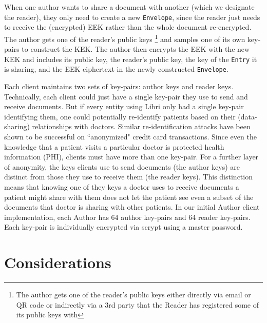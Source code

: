 \documentclass[10pt]{article}
\newcommand{\ttt}[1]{\texttt{#1}}
\def\Entry{\ttt{Entry}}
\def\Envelope{\ttt{Envelope}}
\begin{document}
When one author wants to share a document with another (which we designate the reader), they only need to create a new \Envelope{}, since the reader just needs to receive the (encrypted) EEK rather than the whole document re-encrypted. The author gets one of the reader's public keys \footnote{The author gets one of the reader's public keys either directly via email or QR code or indirectly via a 3rd party that the Reader has registered some of its public keys with} and samples one of its own key-pairs to construct the KEK. The author then encrypts the EEK with the new KEK and includes its public key, the reader's public key, the key of the \Entry{} it is sharing, and the EEK ciphertext in the newly constructed \Envelope{}. 

Each client maintains two sets of key-pairs: author keys and reader keys. Technically, each client could just have a single key-pair they use to send and receive documents. But if every entity using Libri only had a single key-pair identifying them, one could potentially re-identify patients based on their (data-sharing) relationships with doctors. Similar re-identification attacks have been shown to be successful on ``anonymized" credit card transactions. Since even the knowledge that a patient visits a particular doctor is protected health information (PHI), clients must have more than one key-pair. For a further layer of anonymity, the keys clients use to send documents (the author keys) are distinct from those they use to receive them (the reader keys). This distinction means that knowing one of they keys a doctor uses to receive documents a patient might share with them does not let the patient see even a subset of the documents that doctor is sharing with other patients. In our initial Author client implementation, each Author has 64 author key-pairs and 64 reader key-pairs. Each key-pair is individually encrypted via scrypt \cite{scrypt} using a master password.

\section{Considerations}
\end{document}
